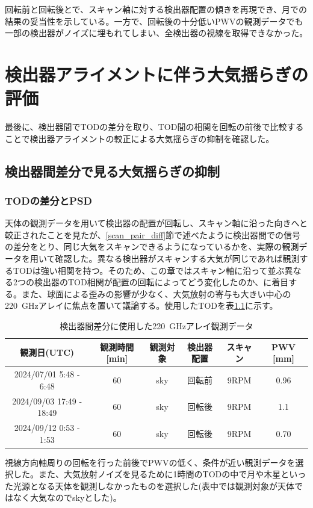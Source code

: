 回転前と回転後とで、スキャン軸に対する検出器配置の傾きを再現でき、月での結果の妥当性を示している。一方で、回転後の十分低いPWVの観測データでも一部の検出器がノイズに埋もれてしまい、全検出器の視線を取得できなかった。
\chapter{検出器アライメントに伴う大気揺らぎの評価}
\label{chapter4_3}
最後に、検出器間でTODの差分を取り、TOD間の相関を回転の前後で比較することで検出器アライメントの較正による大気揺らぎの抑制を確認した。
\section{検出器間差分で見る大気揺らぎの抑制}

\subsection{TODの差分とPSD}
天体の観測データを用いて検出器の配置が回転し、スキャン軸に沿った向きへと較正されたことを見たが、\ref{scan_pair_diff}節で述べたように検出器間での信号の差分をとり、同じ大気をスキャンできるようになっているかを、実際の観測データを用いて確認した。異なる検出器がスキャンする大気が同じであれば観測するTODは強い相関を持つ。そのため、この章ではスキャン軸に沿って並ぶ異なる2つの検出器のTOD相関が配置の回転によってどう変化したのか、に着目する。また、球面による歪みの影響が少なく、大気放射の寄与も大きい中心の\SI{220}{GHz}アレイに焦点を置いて議論する。使用したTODを表\ref{pair_diff_table}に示す。
\begin{table}[htbp]
  \centering
  \caption{検出器間差分に使用した\SI{220}{GHz}アレイ観測データ}
  \vspace{3mm}
  \begin{tabular}{cccccc} \hline\hline
    観測日(UTC) & 観測時間 [min] & 観測対象 & 検出器配置 & スキャン & PWV [mm]\\ \hline
    2024/07/01 5:48 - 6:48 & 60 & sky & 回転前 & 9RPM & 0.96\\ \hline
    2024/09/03 17:49 - 18:49 & 60 & sky & 回転後 & 9RPM & 1.1 \\
    2024/09/12 0:53 - 1:53 & 60 & sky & 回転後 & 9RPM & 0.70 \\ \hline\hline

  \end{tabular}
  \label{pair_diff_table}
\end{table}
視線方向軸周りの回転を行った前後でPWVの低く、条件が近い観測データを選択した。また、大気放射ノイズを見るために1時間のTODの中で月や木星といった光源となる天体を観測しなかったものを選択した(表中では観測対象が天体ではなく大気なのでskyとした)。

